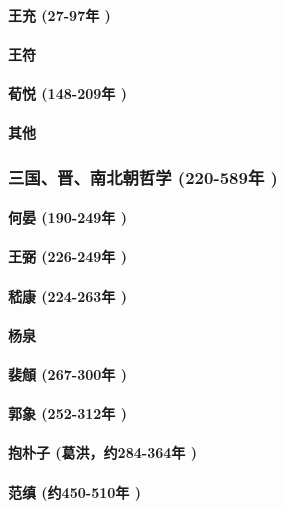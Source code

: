 \documentclass[UTF8]{../RepresentationUniverse}
\begin{document}
        \paragraph{王充 (27-97年 )}
        \paragraph{王符}
        \paragraph{荀悦 (148-209年 )}
        \paragraph{其他}

    \subsubsection{三国、晋、南北朝哲学 (220-589年 )}
        \paragraph{何晏 (190-249年 )}
        \paragraph{王弼 (226-249年 )}
        \paragraph{嵇康 (224-263年 )}
        \paragraph{杨泉}
        \paragraph{裴頠 (267-300年 )}
        \paragraph{郭象 (252-312年 )}
        \paragraph{抱朴子 (葛洪，约284-364年 )}
        \paragraph{范缜 (约450-510年 )}
\end{document}
